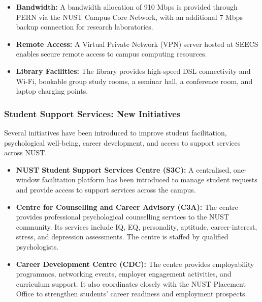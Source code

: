 \begin{itemize}[noitemsep, topsep=0pt]

    \item \textbf{Bandwidth:}
    A bandwidth allocation of 910 Mbps is provided through
    PERN via the NUST Campus Core Network, with an additional
    7 Mbps backup connection for research laboratories.

    \item \textbf{Remote Access:}
    A Virtual Private Network (VPN) server hosted at SEECS
    enables secure remote access to campus computing resources.

    \item \textbf{Library Facilities:}
    The library provides high-speed DSL connectivity and Wi-Fi,
    bookable group study rooms, a seminar hall, a conference
    room, and laptop charging points.

\end{itemize}


\subsubsection{Student Support Services: New Initiatives}
\label{subsubsec:student-support-services}

Several initiatives have been introduced to improve student
facilitation, psychological well-being, career development,
and access to support services across NUST.

\begin{itemize}[noitemsep, topsep=0pt]

    \item \textbf{NUST Student Support Services Centre (S3C):}
    A centralised, one-window facilitation platform has been
    introduced to manage student requests and provide access
    to support services across the campus.

    \item \textbf{Centre for Counselling and Career Advisory (C3A):}
    The centre provides professional psychological counselling
    services to the NUST community. Its services include IQ,
    EQ, personality, aptitude, career-interest, stress, and
    depression assessments. The centre is staffed by
    qualified psychologists.

    \item \textbf{Career Development Centre (CDC):}
    The centre provides employability programmes, networking
    events, employer engagement activities, and curriculum
    support. It also coordinates closely with the NUST
    Placement Office to strengthen students' career readiness
    and employment prospects.

\end{itemize}


